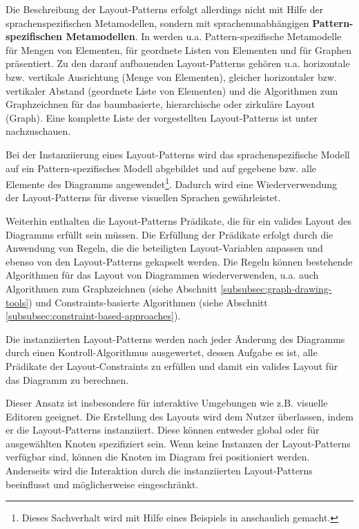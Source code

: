 Die Beschreibung der Layout-Patterns erfolgt allerdings nicht mit Hilfe der sprachenspezifischen Metamodellen, sondern mit sprachenunabhängigen \textbf{Pattern-spezifischen Metamodellen}. In \cite{Maier12A-Pattern-based} werden u.a. Pattern-spezifische Metamodelle für Mengen von Elementen, für geordnete Listen von Elementen und für Graphen präsentiert. Zu den darauf aufbauenden Layout-Patterns gehören u.a. horizontale bzw. vertikale Ausrichtung (Menge von Elementen), gleicher horizontaler bzw. vertikaler Abstand (geordnete Liste von Elementen) und die Algorithmen zum Graphzeichnen für das baumbasierte, hierarchische oder zirkuläre Layout (Graph). Eine komplette Liste der vorgestellten Layout-Patterns ist unter \cite[S.55]{Maier12A-Pattern-based} nachzuschauen.

Bei der Instanziierung eines Layout-Patterns wird das sprachenspezifische Modell auf ein Pattern-spezifisches Modell abgebildet und auf gegebene bzw. alle Elemente des Diagramms angewendet\footnote{Dieses Sachverhalt wird mit Hilfe eines Beispiels in \cite[S.59ff]{Maier12A-Pattern-based} anschaulich gemacht.}. Dadurch wird eine Wiederverwendung der Layout-Patterns für diverse visuellen Sprachen gewährleistet.

Weiterhin enthalten die Layout-Patterns Prädikate, die für ein valides Layout des Diagramms erfüllt sein müssen. Die Erfüllung der Prädikate erfolgt durch die Anwendung von Regeln, die die beteiligten Layout-Variablen anpassen und ebenso von den Layout-Patterns gekapselt werden. Die Regeln können bestehende Algorithmen für das Layout von Diagrammen wiederverwenden, u.a. auch Algorithmen zum Graphzeichnen (siehe Abschnitt \ref{subsubsec:graph-drawing-tools}) und Constraints-basierte Algorithmen (siehe Abschnitt \ref{subsubsec:constraint-based-approaches}).

Die instanziierten Layout-Patterns werden nach jeder Änderung des Diagramms durch einen Kontroll-Algorithmus ausgewertet, dessen Aufgabe es ist, alle Prädikate der Layout-Constraints zu erfüllen und damit ein valides Layout für das Diagramm zu berechnen.

Dieser Ansatz ist insbesondere für interaktive Umgebungen wie z.B. visuelle Editoren geeignet. Die Erstellung des Layouts wird dem Nutzer überlassen, indem er die Layout-Patterns instanziiert. Diese können entweder global oder für ausgewählten Knoten spezifiziert sein. Wenn keine Instanzen der Layout-Patterns verfügbar sind, können die Knoten im Diagram frei positioniert werden. Anderseits wird die Interaktion durch die instanziierten Layout-Patterns beeinflusst und möglicherweise eingeschränkt.

